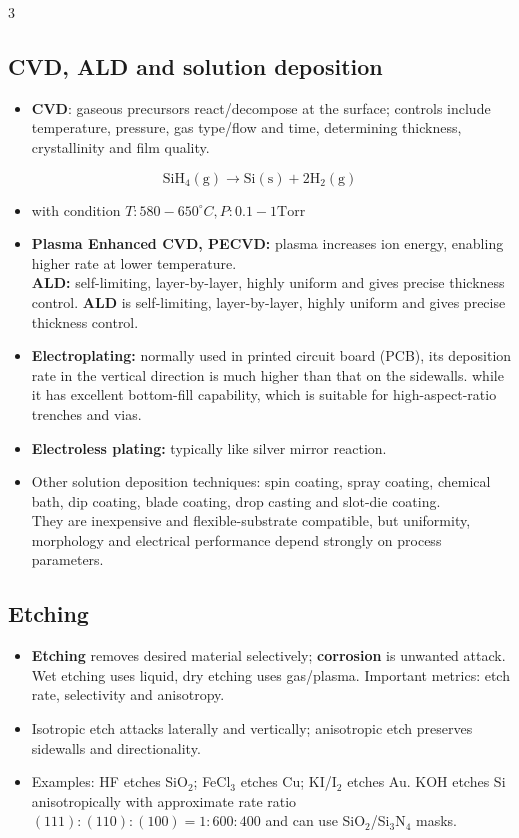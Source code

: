 \documentclass[10pt,a4paper]{ctexart}
\newcommand{\key}[1]{\textbf{#1}}
\newcommand{\formula}[1]{%
  \par\vspace{1pt}\begingroup
  \setlength{\abovedisplayskip}{0pt}\setlength{\belowdisplayskip}{0pt}
  \[#1\]\endgroup\vspace{1pt}}
\begin{document}
\begin{multicols*}{3}
\subsection{CVD, ALD and solution deposition}
\begin{itemize}
  \item \key{CVD}: gaseous precursors react/decompose at the surface;
  controls include temperature, pressure, gas type/flow and time, 
  determining thickness, crystallinity and film quality.
\end{itemize}
\formula{\displaystyle \mathrm{SiH_4(g)\rightarrow Si(s)+2H_2(g)}}
\begin{itemize}
  \item with condition $T:580-650^\circ C, P:0.1-1  \mathrm{Torr}$
  \item \key{Plasma Enhanced CVD, PECVD:} plasma increases ion energy, 
  enabling higher rate at lower temperature.\\ 
  \key{ALD:} self-limiting, layer-by-layer, highly uniform and gives precise thickness control.
  \key{ALD} is self-limiting, layer-by-layer, highly uniform and gives precise thickness control.
  \item \key{Electroplating:} normally used in printed circuit board (PCB), 
  its deposition rate in the vertical direction is much higher than that on the sidewalls.
  while it has excellent bottom-fill capability, which is suitable for high-aspect-ratio trenches and vias.
  \item \key{Electroless plating:} typically like silver mirror reaction.
  \item Other solution deposition techniques: spin coating, spray coating, chemical bath, 
  dip coating, blade coating, drop casting and slot-die coating. \\
  They are inexpensive and flexible-substrate compatible, but uniformity, 
  morphology and electrical performance depend strongly on process parameters.
\end{itemize}

\subsection{Etching}
\begin{itemize}
  \item \key{Etching} removes desired material selectively; \key{corrosion}
  is unwanted attack. Wet etching uses liquid, dry etching uses gas/plasma.
  Important metrics: etch rate, selectivity and anisotropy.
  \item Isotropic etch attacks laterally and vertically; anisotropic etch
  preserves sidewalls and directionality.
  \item Examples: HF etches SiO$_2$; FeCl$_3$ etches Cu; KI/I$_2$ etches Au.
  KOH etches Si anisotropically with approximate rate ratio
  $(111):(110):(100)=1:600:400$ and can use SiO$_2$/Si$_3$N$_4$ masks.
\end{itemize}


\end{multicols*}
\end{document}
